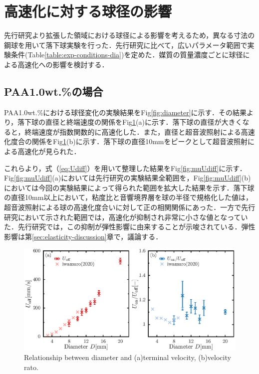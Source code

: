 \section{高速化に対する球径の影響}
\label{sec:diameter}
先行研究より拡張した領域における球径による影響を考えるため，異なる寸法の鋼球を用いて落下球実験を行った．先行研究に比べて，広いパラメータ範囲で実験条件(Table\ref{table:exp-conditions-dia})を定めた．媒質の質量濃度ごとに球径による高速化への影響を検討する．

\subsection{PAA1.0wt.\%の場合}
PAA1.0wt.\%における球径変化の実験結果をFig\ref{fig:diameter}に示す．その結果より，落下球の直径と終端速度の関係をFig\ref{fig:diaUT}(a)に示す．落下球の直径が大きくなると，終端速度が指数関数的に高速化した．また，直径と超音波照射による高速化度合の関係をFig\ref{fig:diaUT}(b)に示す．落下球の直径10mmをピークとして超音波照射による高速化が見られた．

これらより，式（\ref{eq:Udiff}）を用いて整理した結果をFig\ref{fig:muUdiff}に示す．Fig\ref{fig:muUdiff}(a)においては先行研究\cite{ref:8}の実験結果全範囲を，Fig\ref{fig:muUdiff}(b)においては今回の実験結果によって得られた範囲を拡大した結果を示す．落下球の直径10mm以上において，粘度比と音響境界層を球の半径で規格化した値は，超音波照射による球の高速化度合いに対して正の相関関係にあった．一方で先行研究\cite{ref:8}において示された範囲では，高速化が抑制され非常に小さな値となっていた．先行研究\cite{ref:8}では，この抑制が弾性影響に由来することが示唆されている．弾性影響は第\ref{sec:elasticity-discussion}章で，議論する．

\begin{figure}[ht]
    \centering
    \includegraphics[width=1\textwidth]{./5-Results/diaUT_Udiff.eps}
    \caption{Relationship between diameter and (a)terminal velocity, (b)velocity rato.}
    \label{fig:diaUT}
\end{figure}

